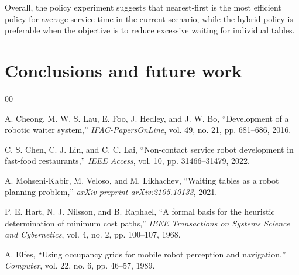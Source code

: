 \documentclass[conference]{IEEEtran}
\begin{document}
Overall, the policy experiment suggests that nearest-first is the most
efficient policy for average service time in the current scenario, while the
hybrid policy is preferable when the objective is to reduce excessive waiting
for individual tables.


\section{Conclusions and future work}



\begin{thebibliography}{00}

A. Cheong, M. W. S. Lau, E. Foo, J. Hedley, and J. W. Bo,
``Development of a robotic waiter system,''
\textit{IFAC-PapersOnLine}, vol. 49, no. 21, pp. 681--686, 2016.

C. S. Chen, C. J. Lin, and C. C. Lai,
``Non-contact service robot development in fast-food restaurants,''
\textit{IEEE Access}, vol. 10, pp. 31466--31479, 2022.

A. Mohseni-Kabir, M. Veloso, and M. Likhachev,
``Waiting tables as a robot planning problem,''
\textit{arXiv preprint arXiv:2105.10133}, 2021.

P. E. Hart, N. J. Nilsson, and B. Raphael,
``A formal basis for the heuristic determination of minimum cost paths,''
\textit{IEEE Transactions on Systems Science and Cybernetics},
vol. 4, no. 2, pp. 100--107, 1968.

A. Elfes,
``Using occupancy grids for mobile robot perception and navigation,''
\textit{Computer}, vol. 22, no. 6, pp. 46--57, 1989.

\end{thebibliography}
\end{document}
